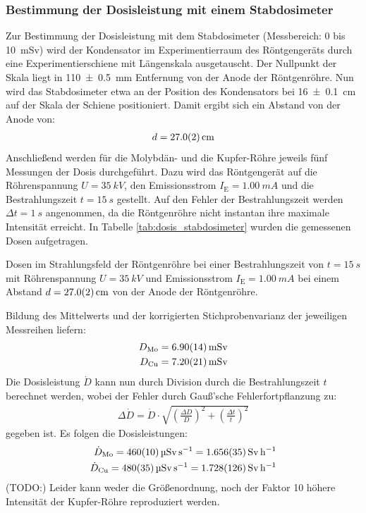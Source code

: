 \documentclass[11pt, a4paper]{article}
\numberwithin{equation}{section}
\newcommand{\korr}[1]{{\color{red}(#1)}}
\begin{document}
\subsubsection{Bestimmung der Dosisleistung mit einem Stabdosimeter}
Zur Bestimmung der Dosisleistung mit dem Stabdosimeter (Messbereich: \num{0} bis \SI{10}{mSv}) wird der Kondensator im Experimentierraum des Röntgengeräts durch eine Experimentierschiene mit Längenskala ausgetauscht.
Der Nullpunkt der Skala liegt in \SI{110 +- 0.5}{mm} Entfernung von der Anode der Röntgenröhre.
Nun wird das Stabdosimeter etwa an der Position des Kondensators bei \SI{16 +- 0.1}{cm} auf der Skala der Schiene positioniert.
Damit ergibt sich ein Abstand von der Anode von:
\begin{align*}
	d = \SI{27.0 +- 0.2}{cm}
\end{align*}
Anschließend werden für die Molybdän- und die Kupfer-Röhre jeweils fünf Messungen der Dosis durchgeführt.
Dazu wird das Röntgengerät auf die Röhrenspannung $U = \SI{35}{kV}$, den Emissionsstrom $I_\mathrm{E} = \SI{1.00}{mA}$ und die Bestrahlungszeit $t = \SI{15}{s}$ gestellt.
Auf den Fehler der Bestrahlungszeit werden $\Delta t = \SI{1}{s}$ angenommen, da die Röntgenröhre nicht instantan ihre maximale Intensität erreicht.
In Tabelle \ref{tab:dosis_stabdosimeter} wurden die gemessenen Dosen aufgetragen.
\begin{table}[h]
	\centering
	
	\caption{Dosen im Strahlungsfeld der Röntgenröhre bei einer Bestrahlungszeit von $t=\SI{15}{s}$ mit Röhrenspannung $U=\SI{35}{kV}$ und Emissionsstrom $I_\mathrm{E} = \SI{1.00}{mA}$ bei einem Abstand $d=\SI{27 +- 0.2}{cm}$ von der Anode der Röntgenröhre.}
	\label{tab:dosis_stabdosimeter}
\end{table}
Bildung des Mittelwerts und der korrigierten Stichprobenvarianz der jeweiligen Messreihen liefern:
\begin{align*}
	D_\mathrm{Mo} = \SI{6.90 +- 0.14}{mSv} \\
	D_\mathrm{Cu} = \SI{7.20 +- 0.21}{mSv}
\end{align*}
Die Dosisleistung $\dot{D}$ kann nun durch Division durch die Bestrahlungszeit $t$ berechnet werden, wobei der Fehler durch Gauß'sche Fehlerfortpflanzung zu:
\begin{align}
	\Delta \dot{D} = \dot{D} \cdot \sqrt{\left( \frac{\Delta D}{D} \right)^2 + \left( \frac{\Delta t}{t} \right)^2}
\end{align}
gegeben ist.
Es folgen die Dosisleistungen:
\begin{align*}
	\dot{D}_\mathrm{Mo} = \SI{460 +- 10}{\micro\sievert\per\second} = \SI{1.656 +- 0.035}{\sievert\per\hour}\\
	\dot{D}_\mathrm{Cu} = \SI{480 +- 35}{\micro\sievert\per\second} = \SI{1.728 +- 0.126}{\sievert\per\hour}
\end{align*}
\korr{TODO:} Leider kann weder die Größenordnung, noch der Faktor 10 höhere Intensität der Kupfer-Röhre reproduziert werden.
\end{document}
